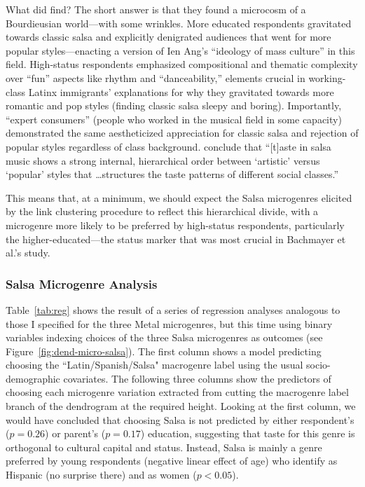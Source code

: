 \documentclass[a4paper,12pt]{article}
\begin{document}
What did \citet{Bachmayer2014-pk} find? The short answer is that they found a microcosm of a Bourdieusian world---with some wrinkles. More educated respondents gravitated towards classic salsa and explicitly denigrated audiences that went for more popular styles---enacting a version of Ien Ang's \citeyearpar{ang2000dallas} ``ideology of mass culture'' in this field. High-status respondents emphasized compositional and thematic complexity over ``fun'' aspects like rhythm and ``danceability,'' elements crucial in working-class Latinx immigrants' explanations for why they gravitated towards more romantic and pop styles (finding classic salsa sleepy and boring). Importantly, ``expert consumers'' (people who worked in the musical field in some capacity) demonstrated the same aestheticized appreciation for classic salsa and rejection of popular styles regardless of class background. \citep[][62]{Bachmayer2014-pk} conclude that ``[t]aste in salsa music shows a strong internal, hierarchical order between `artistic' versus `popular' styles that \ldots structures the taste patterns of different social classes.'' 

This means that, at a minimum, we should expect the Salsa microgenres elicited by the link clustering procedure to reflect this hierarchical divide, with a microgenre more likely to be preferred by high-status respondents, particularly the higher-educated---the status marker that was most crucial in Bachmayer et al.'s study. 

\subsubsection{Salsa Microgenre Analysis}
Table~\ref{tab:reg} shows the result of a series of regression analyses analogous to those I specified for the three Metal microgenres, but this time using binary variables indexing choices of the three Salsa microgenres as outcomes (see Figure~\ref{fig:dend-micro-salsa}). The first column shows a model predicting choosing the ``Latin/Spanish/Salsa" macrogenre label using the usual socio-demographic covariates. The following three columns show the predictors of choosing each microgenre variation extracted from cutting the macrogenre label branch of the dendrogram at the required height. Looking at the first column, we would have concluded that choosing Salsa is not predicted by either respondent's ($p = 0.26$) or parent's ($p = 0.17$) education, suggesting that taste for this genre is orthogonal to cultural capital and status. Instead, Salsa is mainly a genre preferred by young respondents (negative linear effect of age) who identify as Hispanic (no surprise there) and as women ($p < 0.05$). 
\end{document}
